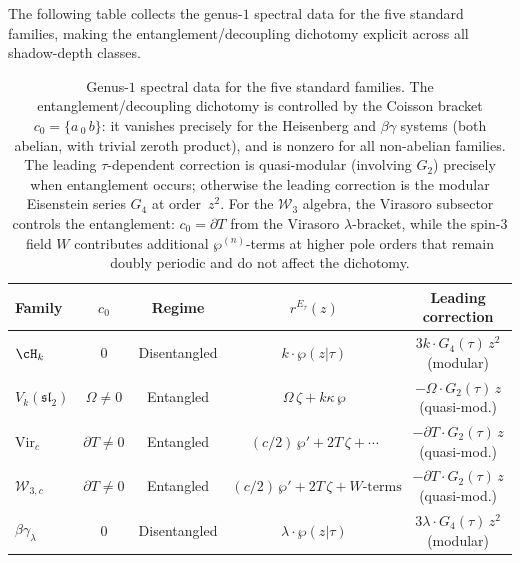 The following table collects the genus-$1$ spectral data
for the five standard families, making the
entanglement/decoupling dichotomy explicit across all
shadow-depth classes.

\begin{table}[ht]
\centering
\renewcommand{\arraystretch}{1.3}
\begin{tabular}{lcccc}
\toprule
\textbf{Family}
 & $c_0$
 & \textbf{Regime}
 & $r^{E_\tau}(z)$
 & \textbf{Leading correction} \\
\midrule
$\cH_k$
 & $0$
 & Disentangled
 & $k \cdot \wp(z|\tau)$
 & $3k \cdot G_4(\tau)\,z^2$
 \;\textup{(modular)} \\[2pt]
$V_k(\mathfrak{sl}_2)$
 & $\Omega \ne 0$
 & Entangled
 & $\Omega\,\zeta + k\kappa\,\wp$
 & $-\Omega \cdot G_2(\tau)\,z$
 \;\textup{(quasi-mod.)} \\[2pt]
$\mathrm{Vir}_c$
 & $\partial T \ne 0$
 & Entangled
 & $(c/2)\,\wp' + 2T\,\zeta + \cdots$
 & $-\partial T \cdot G_2(\tau)\,z$
 \;\textup{(quasi-mod.)} \\[2pt]
$\mathcal{W}_{3,c}$
 & $\partial T \ne 0$
 & Entangled
 & $(c/2)\,\wp' + 2T\,\zeta + W\text{-terms}$
 & $-\partial T \cdot G_2(\tau)\,z$
 \;\textup{(quasi-mod.)} \\[2pt]
$\beta\gamma_\lambda$
 & $0$
 & Disentangled
 & $\lambda \cdot \wp(z|\tau)$
 & $3\lambda \cdot G_4(\tau)\,z^2$
 \;\textup{(modular)} \\
\bottomrule
\end{tabular}
\caption{Genus-$1$ spectral data for the five standard families.
The entanglement/decoupling dichotomy is controlled by the Coisson
bracket $c_0 = \{a\,{}_0\,b\}$: it vanishes precisely for the
Heisenberg and $\beta\gamma$ systems (both abelian, with trivial
zeroth product), and is nonzero for all non-abelian families. The
leading $\tau$-dependent correction is quasi-modular (involving $G_2$)
precisely when entanglement occurs; otherwise the leading correction is
the modular Eisenstein series $G_4$ at order~$z^2$. For the
$\mathcal{W}_3$ algebra, the Virasoro subsector controls the
entanglement: $c_0 = \partial T$ from the Virasoro $\lambda$-bracket,
while the spin-$3$ field $W$ contributes additional $\wp^{(n)}$-terms
at higher pole orders that remain doubly periodic and do not affect
the dichotomy.}
\label{tab:genus-1-spectral-data}
\end{table}

